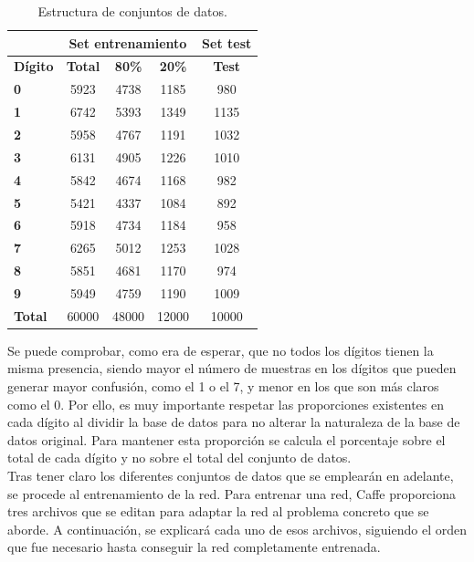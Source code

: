 \begin{table}[H]
	\centering
	\begin{tabular}{l|c|c|c|c|}
		\cline{2-5}
		& \multicolumn{3}{|c|}{\textbf{Set entrenamiento}} & \textbf{Set test} \\
		\hline
		\multicolumn{1}{|l|}{\textbf{Dígito}} & \textbf{Total} & \textbf{80\%} & \textbf{20\%} & \textbf{Test}\\
		\hline 
		\multicolumn{1}{|l|}{\textbf{0}} & 5923 & 4738 & 1185 & 980\\ \hline
		\multicolumn{1}{|l|}{\textbf{1}} & 6742 & 5393 & 1349 & 1135\\ \hline
		\multicolumn{1}{|l|}{\textbf{2}} & 5958 & 4767 & 1191 & 1032\\ \hline
		\multicolumn{1}{|l|}{\textbf{3}} & 6131 & 4905 & 1226 & 1010\\ \hline
		\multicolumn{1}{|l|}{\textbf{4}} & 5842 & 4674 & 1168 & 982\\ \hline
		\multicolumn{1}{|l|}{\textbf{5}} & 5421 & 4337 & 1084 & 892\\ \hline
		\multicolumn{1}{|l|}{\textbf{6}} & 5918 & 4734 & 1184 & 958\\ \hline
		\multicolumn{1}{|l|}{\textbf{7}} & 6265 & 5012 & 1253 & 1028\\ \hline
		\multicolumn{1}{|l|}{\textbf{8}} & 5851 & 4681 & 1170 & 974\\ \hline
		\multicolumn{1}{|l|}{\textbf{9}} & 5949 & 4759 & 1190 & 1009\\ \hline
		\multicolumn{1}{|l|}{\textbf{Total}} & 60000 & 48000 & 12000 & 10000\\ \hline
	\end{tabular}
	\caption{Estructura de conjuntos de datos.}
	\label{tab.baseDatos}
\end{table}

Se puede comprobar, como era de esperar, que no todos los dígitos tienen la misma presencia, siendo mayor el número de muestras en los dígitos que pueden generar mayor confusión, como el 1 o el 7, y menor en los que son más claros como el 0. Por ello, es muy importante respetar las proporciones existentes en cada dígito al dividir la base de datos para no alterar la naturaleza de la base de datos original. Para mantener esta proporción se calcula el porcentaje sobre el total de cada dígito y no sobre el total del conjunto de datos.\\

Tras tener claro los diferentes conjuntos de datos que se emplearán en adelante, se procede al entrenamiento de la red. Para entrenar una red, Caffe proporciona tres archivos que se editan para adaptar la red al problema concreto que se aborde. A continuación, se explicará cada uno de esos archivos, siguiendo el orden que fue necesario hasta conseguir la red completamente entrenada.

